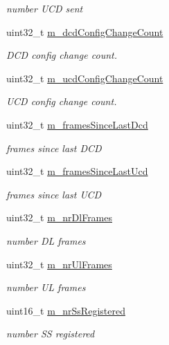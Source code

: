 \begin{DoxyCompactItemize}
\begin{DoxyCompactList}\small\item\em number U\+CD sent \end{DoxyCompactList}\item 
uint32\+\_\+t \hyperlink{classns3_1_1BaseStationNetDevice_abcdaea98567567d67375bea8eb9cfb56}{m\+\_\+dcd\+Config\+Change\+Count}
\begin{DoxyCompactList}\small\item\em D\+CD config change count. \end{DoxyCompactList}\item 
uint32\+\_\+t \hyperlink{classns3_1_1BaseStationNetDevice_a415c7021411c7acc8f3945acd59a9537}{m\+\_\+ucd\+Config\+Change\+Count}
\begin{DoxyCompactList}\small\item\em U\+CD config change count. \end{DoxyCompactList}\item 
uint32\+\_\+t \hyperlink{classns3_1_1BaseStationNetDevice_a4143df76d229e53d11216f64b67ec8ae}{m\+\_\+frames\+Since\+Last\+Dcd}
\begin{DoxyCompactList}\small\item\em frames since last D\+CD \end{DoxyCompactList}\item 
uint32\+\_\+t \hyperlink{classns3_1_1BaseStationNetDevice_abe5e57d65350ab5cee9c7c3d4742bef5}{m\+\_\+frames\+Since\+Last\+Ucd}
\begin{DoxyCompactList}\small\item\em frames since last U\+CD \end{DoxyCompactList}\item 
uint32\+\_\+t \hyperlink{classns3_1_1BaseStationNetDevice_a5df83bcfabb3aafdb760121347121551}{m\+\_\+nr\+Dl\+Frames}
\begin{DoxyCompactList}\small\item\em number DL frames \end{DoxyCompactList}\item 
uint32\+\_\+t \hyperlink{classns3_1_1BaseStationNetDevice_ab707f73a039c2df7574a53dee7d367d9}{m\+\_\+nr\+Ul\+Frames}
\begin{DoxyCompactList}\small\item\em number UL frames \end{DoxyCompactList}\item 
uint16\+\_\+t \hyperlink{classns3_1_1BaseStationNetDevice_a831c0ed3e7c7c68d8c4021e73ebb4324}{m\+\_\+nr\+Ss\+Registered}
\begin{DoxyCompactList}\small\item\em number SS registered \end{DoxyCompactList}\item 

\end{DoxyCompactItemize}
